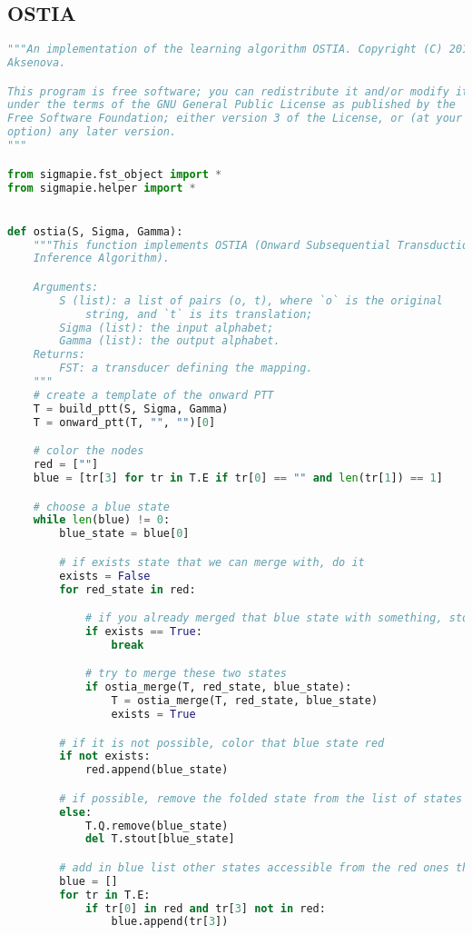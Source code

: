 \subsection*{OSTIA}

\begin{lstlisting}[language=Python]
"""An implementation of the learning algorithm OSTIA. Copyright (C) 2019  Alena
Aksenova.

This program is free software; you can redistribute it and/or modify it
under the terms of the GNU General Public License as published by the
Free Software Foundation; either version 3 of the License, or (at your
option) any later version.
"""

from sigmapie.fst_object import *
from sigmapie.helper import *


def ostia(S, Sigma, Gamma):
    """This function implements OSTIA (Onward Subsequential Transduction
    Inference Algorithm).

    Arguments:
        S (list): a list of pairs (o, t), where `o` is the original
            string, and `t` is its translation;
        Sigma (list): the input alphabet;
        Gamma (list): the output alphabet.
    Returns:
        FST: a transducer defining the mapping.
    """
    # create a template of the onward PTT
    T = build_ptt(S, Sigma, Gamma)
    T = onward_ptt(T, "", "")[0]

    # color the nodes
    red = [""]
    blue = [tr[3] for tr in T.E if tr[0] == "" and len(tr[1]) == 1]

    # choose a blue state
    while len(blue) != 0:
        blue_state = blue[0]

        # if exists state that we can merge with, do it
        exists = False
        for red_state in red:

            # if you already merged that blue state with something, stop
            if exists == True:
                break

            # try to merge these two states
            if ostia_merge(T, red_state, blue_state):
                T = ostia_merge(T, red_state, blue_state)
                exists = True

        # if it is not possible, color that blue state red
        if not exists:
            red.append(blue_state)

        # if possible, remove the folded state from the list of states
        else:
            T.Q.remove(blue_state)
            del T.stout[blue_state]

        # add in blue list other states accessible from the red ones that are not red
        blue = []
        for tr in T.E:
            if tr[0] in red and tr[3] not in red:
                blue.append(tr[3])


\end{lstlisting}
